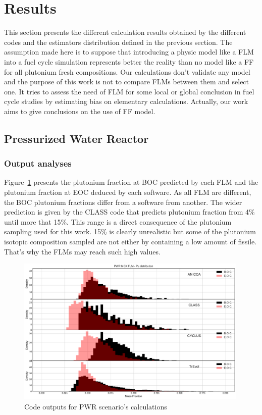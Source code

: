 
\section{Results}
This section presents the different calculation results obtained by the different codes and the estimators distribution defined in the previous section. The assumption made here is to suppose that introducing a physic model like a FLM into a fuel cycle simulation represents better the reality than no model like a FF for all plutonium fresh compositions. Our calculations don't validate any model and the purpose of this work is not to compare FLMs between them and select one. It tries to assess the need of FLM for some local or global conclusion in fuel cycle studies by estimating bias on elementary calculations. Actually, our work aims to give conclusions on the use of FF model.   

\subsection{Pressurized Water Reactor}

\subsubsection{Output analyses}
Figure~\ref{fig:PWR_MOX_FLM_Pu} presents the plutonium fraction at BOC predicted by each FLM and the plutonium fraction at EOC deduced by each software. As all FLM are different, the BOC plutonium fractions differ from a software from another. The wider prediction is given by the CLASS code that predicts plutonium fraction from 4\% until more that 15\%. This range is a direct consequence of the plutonium sampling used for this work. 15\% is clearly unrealistic but some of the plutonium isotopic composition sampled are not either by containing a low amount of fissile. That's why the FLMs may reach such high values.    

\begin{figure}[h]
	\begin{center}
		\includegraphics[width = 0.99\textwidth]{../../Feature_1/RAW_DATA/FIG/PWR_MOX_FLM_Pu.pdf}
		\caption{Code outputs for PWR scenario's calculations}
		\label{fig:PWR_MOX_FLM_Pu}
	\end{center}
\end{figure}

